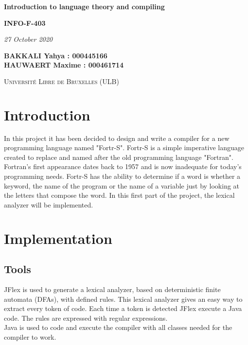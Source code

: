 \documentclass{article}
\begin{document}
\begin{titlepage}
    \begin{center}
        \vspace*{1cm}


        \Huge
        \textbf{Introduction to language theory and compiling}
        \vspace{0.25cm}

        \LARGE
        \textbf{INFO-F-403}

        \vspace{0.25cm}
        \LARGE

        \vspace{0.25cm}
        \textit{27 October 2020}

        \vspace{3cm}
           \Large
        \textbf{BAKKALI Yahya : 000445166 \\}
        \textbf{HAUWAERT Maxime : 000461714 \\}


        \vspace{2cm}

        \textsc{Université Libre de Bruxelles (ULB)}


    \end{center}
\end{titlepage}

\tableofcontents
\newpage

\section{Introduction}
In this project it has been decided to design and write a compiler for a new programming language named "Fortr-S".
Fortr-S is a simple imperative language created to replace and named after the old programming language "Fortran".
Fortran's first appearance dates back to 1957 and is now inadequate for today's programming needs.
Fortr-S has the ability to determine if a word is whether a keyword, the name of the program or the name of a variable just by looking at the letters that compose the word. In this first part of the project, the lexical analyzer will be implemented.

\section{Implementation}
\subsection{Tools}
JFlex is used to generate a lexical analyzer, based on deterministic finite automata (DFAs), with defined rules. This lexical analyzer gives an easy way to extract every token of code. Each time a token is detected JFlex execute a Java code. The rules are expressed with regular expressions. \\
Java is used to code and execute the compiler with all classes needed for the compiler to work.
\end{document}
